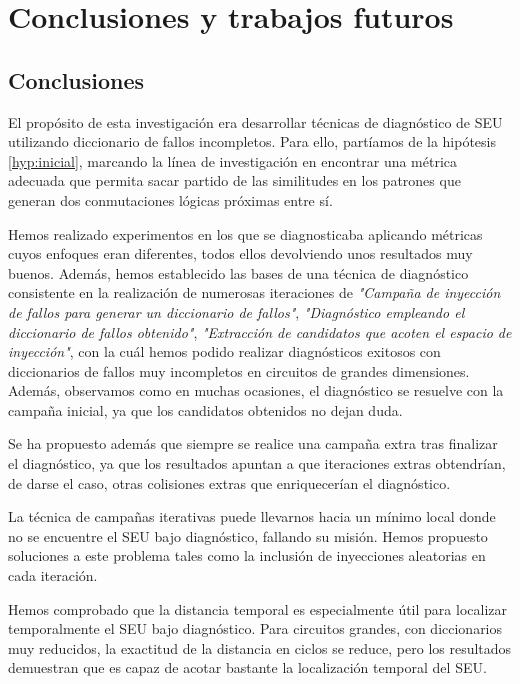 \chapter{Conclusiones y trabajos futuros}
\label{ch:FFdist}

\section{Conclusiones}
\label{sec:Conclusiones}
El propósito de esta investigación era desarrollar técnicas de diagnóstico de
\gls{SEU} utilizando diccionario de fallos incompletos. Para ello, partíamos de la
hipótesis \ref{hyp:inicial}, marcando la línea de investigación en encontrar una
métrica adecuada que permita sacar partido de las similitudes en los patrones que
generan dos conmutaciones lógicas próximas entre sí.

Hemos realizado experimentos en los que se diagnosticaba aplicando métricas cuyos
enfoques eran diferentes, todos ellos devolviendo unos resultados muy buenos.
Además, hemos establecido las bases de una técnica de diagnóstico consistente en
la realización de numerosas iteraciones de \textit{"Campaña de inyección de 
fallos para generar un diccionario de fallos"}, \textit{"Diagnóstico empleando el
diccionario de fallos obtenido"}, \textit{"Extracción de candidatos que acoten el
espacio de inyección"}, con la cuál hemos podido realizar diagnósticos exitosos 
con diccionarios de fallos muy incompletos en circuitos de grandes dimensiones.
Además, observamos como en muchas ocasiones, el diagnóstico se resuelve con la
campaña inicial, ya que los candidatos obtenidos no dejan duda.

Se ha propuesto además que siempre se realice una campaña extra tras finalizar el
diagnóstico, ya que los resultados apuntan a que iteraciones extras obtendrían, de
darse el caso, otras colisiones extras que enriquecerían el diagnóstico.

La técnica de campañas iterativas puede llevarnos hacia un mínimo local donde no
se encuentre el \gls{SEU} bajo diagnóstico, fallando su misión. Hemos propuesto
soluciones a este problema tales como la inclusión de inyecciones aleatorias en
cada iteración.

Hemos comprobado que la distancia temporal es especialmente útil para localizar
temporalmente el \gls{SEU} bajo diagnóstico. Para circuitos grandes, con
diccionarios muy reducidos, la exactitud de la distancia en ciclos se reduce, pero
los resultados demuestran que es capaz de acotar bastante la localización temporal
del \gls{SEU}.

